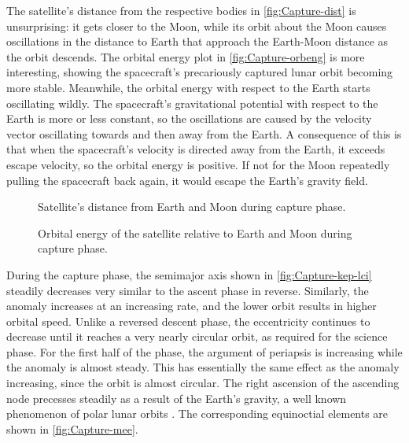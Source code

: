 %

The satellite's distance from the respective bodies in \autoref{fig:Capture-dist} is unsurprising: it gets closer to the Moon, while its orbit about the Moon causes oscillations in the distance to Earth that approach the Earth-Moon distance as the orbit descends. The orbital energy plot in \autoref{fig:Capture-orbeng} is more interesting, showing the spacecraft's precariously captured lunar orbit becoming more stable. Meanwhile, the orbital energy with respect to the Earth starts oscillating wildly. The spacecraft's gravitational potential with respect to the Earth is more or less constant, so the oscillations are caused by the velocity vector oscillating towards and then away from the Earth. A consequence of this is that when the spacecraft's velocity is directed away from the Earth, it exceeds escape velocity, so the orbital energy is positive. If not for the Moon repeatedly pulling the spacecraft back again, it would escape the Earth's gravity field.

\begin{figure}
\centering
\def\svgwidth{\figurewidth}

\caption{Satellite's distance from Earth and Moon during capture phase.} \label{fig:Capture-dist}
\end{figure}

\begin{figure}
\centering
\def\svgwidth{\figurewidth}

\caption{Orbital energy of the satellite relative to Earth and Moon during capture phase.} \label{fig:Capture-orbeng}
\end{figure}

During the capture phase, the semimajor axis shown in \autoref{fig:Capture-kep-lci} steadily decreases very similar to the ascent phase in reverse. Similarly, the anomaly increases at an increasing rate, and the lower orbit results in higher orbital speed. Unlike a reversed descent phase, the eccentricity continues to decrease until it reaches a very nearly circular orbit, as required for the science phase. For the first half of the phase, the argument of periapsis is increasing while the anomaly is almost steady. This has essentially the same effect as the anomaly increasing, since the orbit is almost circular. The right ascension of the ascending node precesses steadily as a result of the Earth's gravity, a well known phenomenon of polar lunar orbits \parencite{Gupta2011}. %
The corresponding equinoctial elements are shown in \autoref{fig:Capture-mee}.

